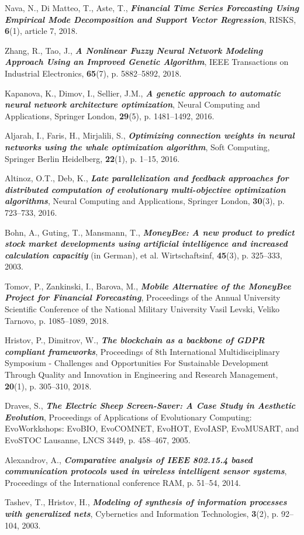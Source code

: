\documentclass[runningheads]{llncs}
\begin{document}
\begin{thebibliography}{8}
 Nava, N., Di Matteo, T., Aste, T., \textbf{\textit{Financial Time Series Forecasting Using Empirical Mode Decomposition and Support Vector Regression}}, RISKS, \textbf{6}(1), article 7, 2018.

 Zhang, R., Tao, J., \textbf{\textit{A Nonlinear Fuzzy Neural Network Modeling Approach Using an Improved Genetic Algorithm}}, IEEE Transactions on Industrial Electronics, \textbf{65}(7), p. 5882--5892, 2018.

 Kapanova, K., Dimov, I., Sellier, J.M., \textbf{\textit{A genetic approach to automatic neural network architecture optimization}}, Neural Computing and Applications, Springer London, \textbf{29}(5), p. 1481--1492, 2016.

 Aljarah, I., Faris, H., Mirjalili, S., \textbf{\textit{Optimizing connection weights in neural networks using the whale optimization algorithm}}, Soft Computing, Springer Berlin Heidelberg, \textbf{22}(1), p. 1–15, 2016.

 Altinoz, O.T., Deb, K., \textbf{\textit{Late parallelization and feedback approaches for distributed computation of evolutionary multi-objective optimization algorithms}}, Neural Computing and Applications, Springer London, \textbf{30}(3), p. 723--733, 2016.

 Bohn, A., Guting, T., Mansmann, T., \textbf{\textit{MoneyBee: A new product to predict stock market developments using artificial intelligence and increased calculation capacitiy}} (in German), et al. Wirtschaftsinf, \textbf{45}(3), p. 325--333, 2003.

 Tomov, P., Zankinski, I., Barova, M., \textbf{\textit{Mobile Alternative of the MoneyBee Project for Financial Forecasting}}, Proceedings of the Annual University Scientific Conference of the National Military University Vasil Levski, Veliko Tarnovo, p. 1085--1089, 2018.

 Hristov, P., Dimitrov, W., \textbf{\textit{The blockchain as a backbone of GDPR compliant frameworks}}, Proceedings of 8th International Multidisciplinary Symposium - Challenges and Opportunities For Sustainable Development Through Quality and Innovation in Engineering and Research Management, \textbf{20}(1), p. 305--310, 2018.

 Draves, S., \textbf{\textit{The Electric Sheep Screen-Saver: A Case Study in Aesthetic Evolution}}, Proceedings of Applications of Evolutionary Computing: EvoWorkkshops: EvoBIO, EvoCOMNET, EvoHOT, EvoIASP, EvoMUSART, and EvoSTOC Lausanne, LNCS 3449, p. 458--467, 2005.

 Alexandrov, A., \textbf{\textit{Comparative analysis of IEEE 802.15.4 based communication protocols used in wireless intelligent sensor systems}}, Proceedings of the International conference RAM, p. 51--54, 2014.

 Tashev, T., Hristov, H., \textbf{\textit{Modeling of synthesis of information processes with generalized nets}}, Cybernetics and Information Technologies, \textbf{3}(2), p. 92--104, 2003.
\end{thebibliography}
\end{document}
